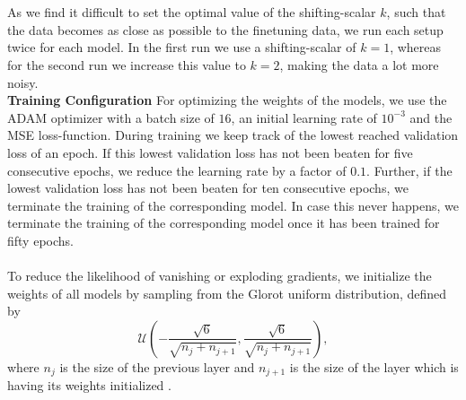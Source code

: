 \documentclass[./main.tex]{subfiles}
\begin{document}
\\
\\
As we find it difficult to set the optimal value of the shifting-scalar $k$, such that the data becomes as close as possible to the finetuning data, we run each setup twice for each model. In the first run we use a shifting-scalar of $k = 1$, whereas for the second run we increase this value to $k = 2$, making the data a lot more noisy.
\\
\textbf{Training Configuration} For optimizing the weights of the models, we use the ADAM optimizer with a batch size of $16$, an initial learning rate of $10^{-3}$ and the MSE loss-function. During training we keep track of the lowest reached validation loss of an epoch. If this lowest validation loss has not been beaten for five consecutive epochs, we reduce the learning rate by a factor of $0.1$. Further, if the lowest validation loss has not been beaten for ten consecutive epochs, we terminate the training of the corresponding model. In case this never happens, we terminate the training of the corresponding model once it has been trained for fifty epochs.
\\
\\
To reduce the likelihood of vanishing or exploding gradients, we initialize the weights of all models by sampling from the Glorot uniform distribution, defined by
\begin{equation}
    \mathcal{U} \left(- \frac{\sqrt{6}}{\sqrt{n_j + n_{j + 1}}}, \frac{\sqrt{6}}{\sqrt{n_j + n_{j + 1}}} \right),
\end{equation}
where $n_j$ is the size of the previous layer and $n_{j + 1}$ is the size of the layer which is having its weights initialized \cite{glorot2010understanding}.
\end{document}
